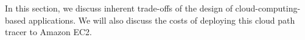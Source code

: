 In this section, we discuss inherent trade-offs of the design of cloud-computing-based applications.
We will also discuss the costs of deploying this cloud path tracer to Amazon EC2.

